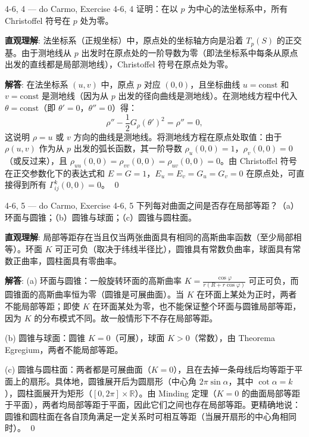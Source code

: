 \begin{exercise}{4-6, 4 — do Carmo, Exercise 4-6, 4}
证明：在以 $p$ 为中心的法坐标系中，所有 Christoffel 符号在 $p$ 处为零。
\end{exercise}

\begin{solution}
\textbf{直观理解}: 法坐标系（正规坐标）中，原点处的坐标轴方向是沿着 $T_p(S)$ 的正交基。由于测地线从 $p$ 出发时在原点处的一阶导数为零（即法坐标系中每条从原点出发的直线都是局部测地线），Christoffel 符号在原点处为零。

\textbf{解答}: 在法坐标系 $(u,v)$ 中，原点 $p$ 对应 $(0,0)$，且坐标曲线 $u = \mathrm{const}$ 和 $v = \mathrm{const}$ 是测地线（因为从 $p$ 出发的径向曲线是测地线）。在测地线方程中代入 $\theta = \mathrm{const}$（即 $\theta' = 0$，$\theta''=0$）得：
\[
\rho'' - \frac{1}{2}G_\rho(\theta')^2 = \rho'' = 0,
\]
这说明 $\rho = u$ 或 $v$ 方向的曲线是测地线。将测地线方程在原点处取值：由于 $\rho(u,v)$ 作为从 $p$ 出发的弧长函数，其一阶导数 $\rho_u(0,0) = 1$，$\rho_v(0,0) = 0$（或反过来），且 $\rho_{uu}(0,0) = \rho_{vv}(0,0) = \rho_{uv}(0,0) = 0$。由 Christoffel 符号在正交参数化下的表达式和 $E=G=1$，$E_u=E_v=G_u=G_v=0$ 在原点处，可直接得到所有 $\Gamma_{ij}^k(0,0) = 0$。
\qed
\end{solution}

\begin{exercise}{4-6, 5 — do Carmo, Exercise 4-6, 5}
下列每对曲面之间是否存在局部等距？（a）环面与圆锥；（b）圆锥与球面；（c）圆锥与圆柱面。
\end{exercise}

\begin{solution}
\textbf{直观理解}: 局部等距存在当且仅当两张曲面具有相同的高斯曲率函数（至少局部相等）。环面 $K$ 可正可负（取决于纬线半径比），圆锥具有常数负曲率，球面具有常数正曲率，圆柱面具有零曲率。

\textbf{解答}: (a) 环面与圆锥：一般旋转环面的高斯曲率 $K = \frac{\cos\varphi}{r(R+r\cos\varphi)}$ 可正可负，而圆锥面的高斯曲率恒为零（圆锥是可展曲面）。当 $K$ 在环面上某处为正时，两者不能局部等距；即使 $K$ 在环面某处为零，也不能保证整个环面与圆锥局部等距，因为 $K$ 的分布模式不同。故一般情形下不存在局部等距。

(b) 圆锥与球面：圆锥 $K=0$（可展），球面 $K>0$（常数），由 Theorema Egregium，两者不能局部等距。

(c) 圆锥与圆柱面：两者都是可展曲面（$K=0$），且在去掉一条母线后均等距于平面上的扇形。具体地，圆锥展开后为圆扇形（中心角 $2\pi\sin\alpha$，其中 $\cot\alpha=k$），圆柱面展开为矩形（$[0,2\pi]\times\mathbb{R}$）。由 Minding 定理（$K=0$ 的曲面局部等距于平面），两者均局部等距于平面，因此它们之间也存在局部等距。更精确地说：圆锥和圆柱面在各自顶角满足一定关系时可相互等距（当展开扇形的中心角相同时）。
\qed
\end{solution}

